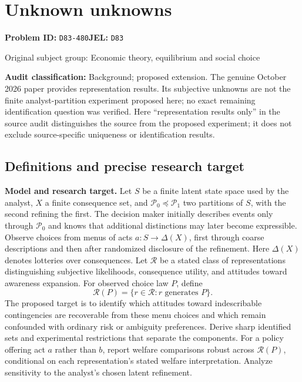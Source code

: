 \documentclass[11pt,a4paper]{article}
\begin{document}
\section*{Unknown unknowns}
\textbf{Problem ID:} \texttt{D83-480}\quad \textbf{JEL:} \texttt{D83}\par
\label{problem:OP-0276}
{\sffamily\small\color{muted}Original subject group: Economic theory, equilibrium and social choice\par}
\label{definitions:problem:30007557}
\textbf{Audit classification:} Background; proposed extension. The genuine October 2026 paper provides representation results. Its subjective unknowns are not the finite analyst-partition experiment proposed here; no exact remaining identification question was verified. Here ``representation results only'' in the source audit distinguishes the source from the proposed experiment; it does not exclude source-specific uniqueness or identification results.
\subsection*{Definitions and precise research target}
\textbf{Model and research target.} Let \(S\) be a finite latent state space used by the analyst, \(X\) a finite consequence set, and \(\mathcal P_0\preceq\mathcal P_1\) two partitions of \(S\), with the second refining the first. The decision maker initially describes events only through \(\mathcal P_0\) and knows that additional distinctions may later become expressible. Observe choices from menus of acts \(a:S\to\Delta(X)\), first through coarse descriptions and then after randomized disclosure of the refinement. Here \(\Delta(X)\) denotes lotteries over consequences. Let \(\mathcal R\) be a stated class of representations distinguishing subjective likelihoods, consequence utility, and attitudes toward awareness expansion. For observed choice law \(P\), define
\[
 \mathcal R(P)=\{r\in\mathcal R:r\text{ generates }P\}.
\]
The proposed target is to identify which attitudes toward indescribable contingencies are recoverable from these menu choices and which remain confounded with ordinary risk or ambiguity preferences. Derive sharp identified sets and experimental restrictions that separate the components. For a policy offering act \(a\) rather than \(b\), report welfare comparisons robust across \(\mathcal R(P)\), conditional on each representation's stated welfare interpretation. Analyze sensitivity to the analyst's chosen latent refinement.
\end{document}
